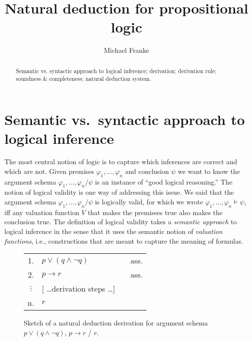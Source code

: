 \documentclass[nobib,nofonts]{tufte-handout}
\title{Natural deduction for propositional logic}
\author[M.~Franke]{Michael Franke}
\date{} %
\newcommand{\mygray}[1]{\textcolor{mygray2}{#1}}
\newcommand{\proplog}{\acro{PropLog}}
\begin{document}
\maketitle

\begin{abstract}
\noindent
Semantic vs. syntactic approach to logical inference; derivation; derivation rule; soundness \& completeness; natural deduction system.
\end{abstract}

\section{Semantic vs.~syntactic approach to logical inference}


The most central notion of logic is to capture which inferences are correct and which are not.
Given premises $\varphi_{1}, \dots, \varphi_{n}$ and conclusion $\psi$ we want to know the argument schema $\varphi_{1}, \dots, \varphi_{n} / \psi$ is an instance of ``good logical reasoning.''
The notion of logical validity is one way of addressing this issue.
We said that the argument schema $\varphi_{1}, \dots, \varphi_{n} / \psi$ is logically valid, for which we wrote $\varphi_{1}, \dots, \varphi_{n} \models \psi$, iff any valuation function $V$ that makes the premisses true also makes the conclusion true.
The definition of logical validity takes a \emph{semantic approach} to logical inference in the sense that it uses the semantic notion of \emph{valuation functions}, i.e., constructions that are meant to capture the meaning of formulas.

\begin{figure}
  \centering
  \begin{tabular}{clcl}
  1. & $p \vee (q \wedge \neg q)$ & & ass. \\
  2. & $p \rightarrow r$ & & ass. \\
  $\vdots$ & \mygray{[ \dots derivation steps \dots]} & &   \\
  n. & $r$ & &   \\
\end{tabular}
\caption{Sketch of a natural deduction derivation for argument schema $p \vee (q \wedge \neg q)$, $p \rightarrow r$ / $r$.}
\label{fig:deduction-schema}
\end{figure}
\end{document}
